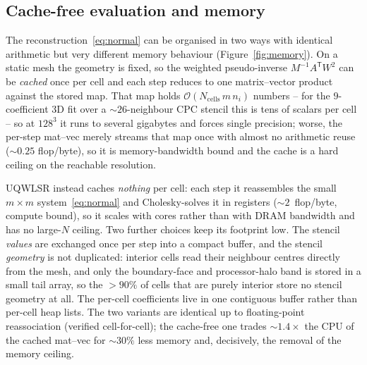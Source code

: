 \documentclass[preprint,3p,11pt]{elsarticle}
\begin{document}
\subsection{Cache-free evaluation and memory}
\label{sec:memory}
The reconstruction~\eqref{eq:normal} can be organised in two ways with identical
arithmetic but very different memory behaviour (Figure~\ref{fig:memory}). On a static
mesh the geometry is fixed, so the weighted pseudo-inverse $M^{-1}A^{\mathsf T}W^{2}$
can be \emph{cached} once per cell and each step reduces to one matrix--vector product
against the stored map. That map holds $\mathcal{O}(N_{\text{cells}}\,m\,n_i)$ numbers
-- for the $9$-coefficient 3D fit over a $\sim\!26$-neighbour CPC stencil this is tens
of scalars per cell -- so at $128^{3}$ it runs to several gigabytes and forces single
precision; worse, the per-step mat--vec merely streams that map once with almost no
arithmetic reuse ($\sim\!0.25$ flop/byte), so it is memory-bandwidth bound and the cache
is a hard ceiling on the reachable resolution.

UQWLSR instead caches \emph{nothing} per cell: each step it reassembles the small
$m\times m$ system~\eqref{eq:normal} and Cholesky-solves it in registers
($\sim\!2$~flop/byte, compute bound), so it scales with cores rather than with DRAM
bandwidth and has no large-$N$ ceiling. Two further choices keep its footprint low. The
stencil \emph{values} are exchanged once per step into a compact buffer, and the stencil
\emph{geometry} is not duplicated: interior cells read their neighbour centres directly
from the mesh, and only the boundary-face and processor-halo band is stored in a small
tail array, so the $>\!90\%$ of cells that are purely interior store no stencil geometry
at all. The per-cell coefficients live in one contiguous buffer rather than per-cell heap
lists. The two variants are identical up to floating-point reassociation (verified
cell-for-cell); the cache-free one trades $\sim\!1.4\times$ the CPU of the cached
mat--vec for $\sim\!30\%$ less memory and, decisively, the removal of the memory ceiling.
\end{document}
